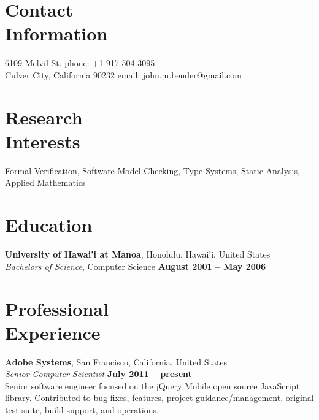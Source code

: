 \documentclass[margin,line]{resume}
\begin{document}
\begin{resume}

  \section{\mysidestyle Contact\\Information}

  6109 Melvil St.                       \hfill phone: +1 917 504 3095\\
  Culver City, California 90232         \hfill email: john.m.bender@gmail.com

  \section{\mysidestyle Research\\Interests}

  Formal Verification, Software Model Checking, Type Systems, Static Analysis, Applied Mathematics

  \section{\mysidestyle Education}

  \textbf{University of Hawai'i at Manoa}, Honolulu, Hawai'i, United States \vspace{2mm}\\\vspace{1mm}%
  \textsl{Bachelors of Science}, Computer Science \hfill \textbf{ August 2001 -- May 2006}\vspace{-3mm}\\\vspace{-1mm}%

  \section{\mysidestyle Professional\\Experience}

  \textbf{Adobe Systems}, San Francisco, California, United States \vspace{1mm}\\
  \textsl{Senior Computer Scientist} \hfill \textbf{July 2011 -- present}\\
  Senior software engineer focused on the jQuery Mobile open source JavaScript library. Contributed to bug fixes, features, project guidance/management, original test suite, build support, and operations.


\end{resume}
\end{document}
